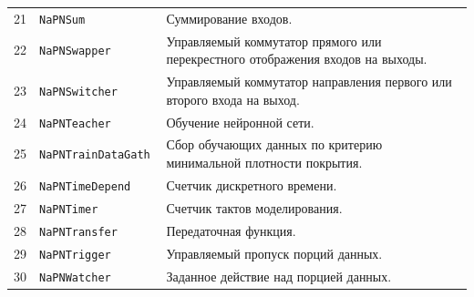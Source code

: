 \begin{table}
\begin{tabular}{|l|l|p{11.5cm}|}
21 & \tt NaPNSum & Суммирование входов. \\
22 & \tt NaPNSwapper & Управляемый коммутатор прямого или перекрестного отображения входов на выходы. \\
23 & \tt NaPNSwitcher & Управляемый коммутатор направления первого или второго входа на выход. \\
24 & \tt NaPNTeacher & Обучение нейронной сети. \\
25 & \tt NaPNTrainDataGath & Сбор обучающих данных по критерию минимальной плотности покрытия. \\
26 & \tt NaPNTimeDepend & Счетчик дискретного времени. \\
27 & \tt NaPNTimer & Счетчик тактов моделирования. \\
28 & \tt NaPNTransfer & Передаточная функция. \\
29 & \tt NaPNTrigger & Управляемый пропуск порций данных. \\
30 & \tt NaPNWatcher & Заданное действие над порцией данных.\\
\hline
\end{tabular}
\end{table}


%
